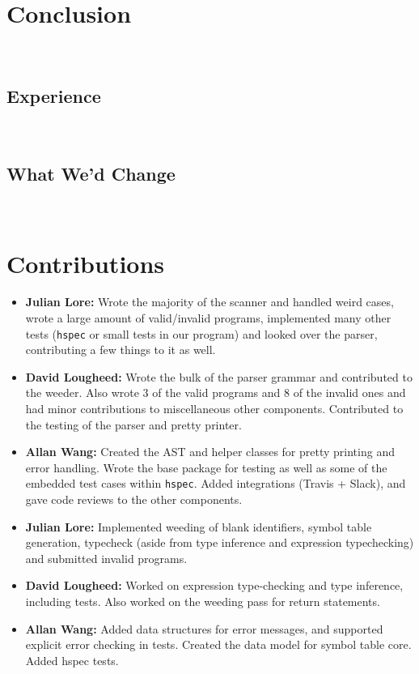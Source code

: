\documentclass[11pt]{article}
\begin{document}
\section{Conclusion}~%
\subsection{Experience}~%
\subsection{What We'd Change}~%
\section{Contributions}
\begin{itemize}
	\item \textbf{Julian Lore:} Wrote the majority of the scanner and handled weird
	      cases, wrote a large amount of valid/invalid programs, implemented
	      many other tests (\texttt{hspec} or small tests in our program) and looked
	      over the parser, contributing a few things to it as well.
	\item \textbf{David Lougheed:} Wrote the bulk of the parser grammar and contributed to
	      the weeder. Also wrote 3 of the valid programs and 8 of the
	      invalid ones and had minor contributions to miscellaneous other components.
	      Contributed to the testing of the parser and pretty printer.
	\item \textbf{Allan Wang:} Created the AST and helper classes for pretty printing
	      and error handling.  Wrote the base package for testing as well as
	      some of the embedded test cases within \texttt{hspec}.  Added integrations
	      (Travis + Slack), and gave code reviews to the other components.
            \end{itemize}
            \begin{itemize}
\item \textbf{Julian Lore:} Implemented weeding of blank identifiers, symbol
table generation, typecheck (aside from type inference and
expression typechecking) and submitted invalid programs.
\item \textbf{David Lougheed:} Worked on expression type-checking and type inference,
including tests. Also worked on the weeding pass for return
statements.
\item \textbf{Allan Wang:} Added data structures for error messages, and supported
explicit error checking in tests. Created the data model for
symbol table core. Added hspec tests.
\end{itemize}
\end{document}
